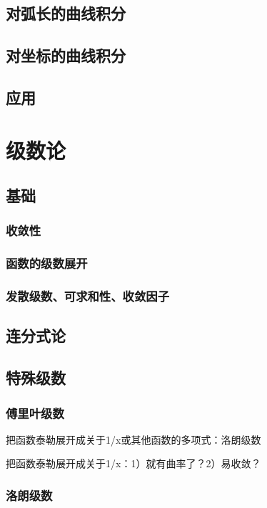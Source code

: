 \documentclass[UTF8]{../../09-Mathematics}
\begin{document}
\section{对弧长的曲线积分}
\section{对坐标的曲线积分}


\section{应用}




\chapter{级数论}

\section{基础}



\subsection{收敛性}
\subsection{函数的级数展开}

\subsection{发散级数、可求和性、收敛因子}



\section{连分式论}



\section{特殊级数}


\subsection{傅里叶级数}

把函数泰勒展开成关于1/x或其他函数的多项式：洛朗级数

把函数泰勒展开成关于1/x：1）就有曲率了？2）易收敛？

\subsection{洛朗级数}
\end{document}

